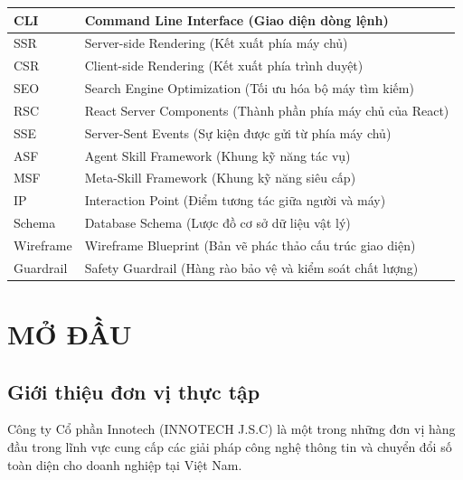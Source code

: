 \documentclass[13pt,a4paper,oneside]{extreport}
\numberwithin{equation}{chapter}
\numberwithin{figure}{chapter}
\numberwithin{table}{chapter}
\begin{document}
\begin{center}
\begin{longtable}{|>{\centering\arraybackslash}p{}|p{}|}
    CLI & Command Line Interface (Giao diện dòng lệnh) \\ \hline
    SSR & Server-side Rendering (Kết xuất phía máy chủ) \\ \hline
    CSR & Client-side Rendering (Kết xuất phía trình duyệt) \\ \hline
    SEO & Search Engine Optimization (Tối ưu hóa bộ máy tìm kiếm) \\ \hline
    RSC & React Server Components (Thành phần phía máy chủ của React) \\ \hline
    SSE & Server-Sent Events (Sự kiện được gửi từ phía máy chủ) \\ \hline
    ASF & Agent Skill Framework (Khung kỹ năng tác vụ) \\ \hline
    MSF & Meta-Skill Framework (Khung kỹ năng siêu cấp) \\ \hline
    IP & Interaction Point (Điểm tương tác giữa người và máy) \\ \hline
    Schema & Database Schema (Lược đồ cơ sở dữ liệu vật lý) \\ \hline
    Wireframe & Wireframe Blueprint (Bản vẽ phác thảo cấu trúc giao diện) \\ \hline
    Guardrail & Safety Guardrail (Hàng rào bảo vệ và kiểm soát chất lượng) \\ \hline
  \end{longtable}
\end{center}

\clearpage
{}
\listoftables
\vspace{0.5cm} %

\clearpage
{}
\listoffigures

\clearpage
{}
\setcounter{page}{1}

\chapter*{MỞ ĐẦU}

\section*{Giới thiệu đơn vị thực tập}
Công ty Cổ phần Innotech (INNOTECH J.S.C) là một trong những đơn vị hàng đầu trong lĩnh vực cung cấp các giải pháp công nghệ thông tin và chuyển đổi số toàn diện cho doanh nghiệp tại Việt Nam.
\end{document}
